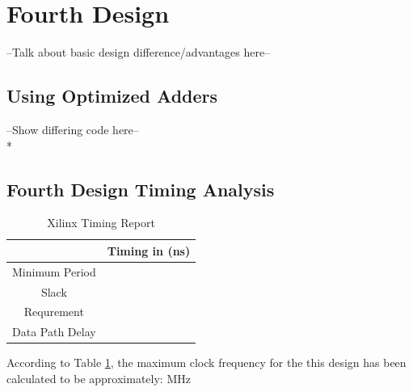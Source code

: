 \section*{Fourth Design}
--Talk about basic design difference/advantages here-- 

\subsection*{Using Optimized Adders}
--Show differing code here-- \\*



\subsection*{Fourth Design Timing Analysis}

\begin{table}[bh]
\caption{Xilinx Timing Report}
\begin{tabular}{c|c}
\centering
           & Timing in (ns) \\
\hline
Minimum Period &     \\

     Slack &     \\

Requrement &        \\

Data Path Delay &     \\
\end{tabular}  
\label{tab:timing4}
\end{table}

According to Table \ref{tab:timing4}, the maximum clock frequency for the this design has been calculated to be approximately:  MHz


